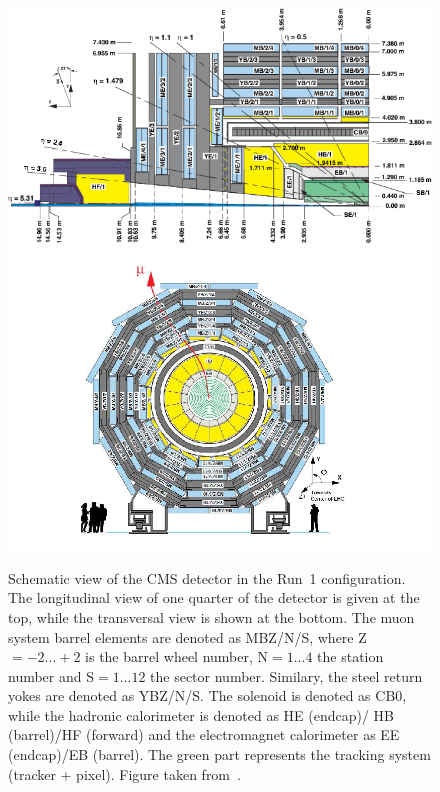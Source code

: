 \begin{figure}[htbp]
	\centering
	\includegraphics[width=1.\linewidth]{2_ExperimentalSetup/Figures/cmsview1}
	\includegraphics[width=1.\linewidth]{2_ExperimentalSetup/Figures/cmsview}
 \caption{Schematic view of the CMS detector in the Run~1 configuration. The longitudinal view of one quarter of the detector is given at the top, while the transversal view is shown at the bottom. The muon system barrel elements are denoted as MBZ/N/S, where Z$=-2...+2$ is the barrel wheel number, N$=1...4$ the station number and S$=1...12$ the sector number. Similary, the steel return yokes are denoted as YBZ/N/S. The solenoid is denoted as CB0, while the hadronic calorimeter is denoted as HE (endcap)/ HB (barrel)/HF (forward) and the electromagnet calorimeter as EE (endcap)/EB (barrel). The green part represents the tracking system (tracker + pixel). Figure taken from~\cite{Chatrchyan:1223944}.}
	\label{fig:CMSview}
\end{figure}

